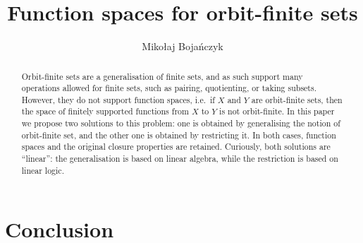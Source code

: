 \documentclass[a4paper,UKenglish,cleveref, autoref, numberwithinsect, thm-restate,anonymous]{lipics-v2021}
\title{Function spaces for orbit-finite sets} %
\author{Miko{\l}aj Boja\'nczyk}{University of Warsaw}{bojan@mimuw.edu.pl}{https://orcid.org/0000-0002-1825-0097}{(Optional) author-specific funding acknowledgements}
\begin{document}
\newcommand{\loli}{\multimap}


\maketitle 
\begin{abstract}
    Orbit-finite sets are a generalisation of finite sets, and as such support many operations allowed for finite sets, such as pairing, quotienting, or taking subsets. However, they do not support function spaces, i.e.~if $X$ and $Y$ are orbit-finite sets, then the space of finitely supported functions from $X$ to $Y$ is not orbit-finite. In this paper we propose two solutions to this problem: one is obtained by generalising the notion of orbit-finite set, and the other one is obtained by restricting it. In both cases, function spaces and the original closure properties are retained. Curiously, both solutions are ``linear'': the generalisation is based on linear algebra, while the restriction is based on linear logic.
\end{abstract}






% 



\section{Conclusion}
\label{sec:conclusion}



\appendix






\end{document}
